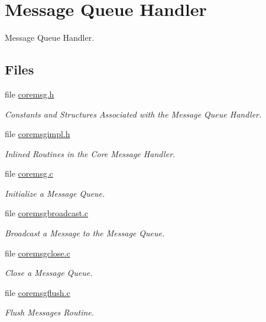 \hypertarget{group__RTEMSScoreMessageQueue}{}\section{Message Queue Handler}
\label{group__RTEMSScoreMessageQueue}


Message Queue Handler.  


\subsection*{Files}
\begin{DoxyCompactItemize}
\item 
file \mbox{\hyperlink{coremsg_8h}{coremsg.\+h}}
\begin{DoxyCompactList}\small\item\em Constants and Structures Associated with the Message Queue Handler. \end{DoxyCompactList}\item 
file \mbox{\hyperlink{coremsgimpl_8h}{coremsgimpl.\+h}}
\begin{DoxyCompactList}\small\item\em Inlined Routines in the Core Message Handler. \end{DoxyCompactList}\item 
file \mbox{\hyperlink{coremsg_8c}{coremsg.\+c}}
\begin{DoxyCompactList}\small\item\em Initialize a Message Queue. \end{DoxyCompactList}\item 
file \mbox{\hyperlink{coremsgbroadcast_8c}{coremsgbroadcast.\+c}}
\begin{DoxyCompactList}\small\item\em Broadcast a Message to the Message Queue. \end{DoxyCompactList}\item 
file \mbox{\hyperlink{coremsgclose_8c}{coremsgclose.\+c}}
\begin{DoxyCompactList}\small\item\em Close a Message Queue. \end{DoxyCompactList}\item 
file \mbox{\hyperlink{coremsgflush_8c}{coremsgflush.\+c}}
\begin{DoxyCompactList}\small\item\em Flush Messages Routine. \end{DoxyCompactList}\item 

\end{DoxyCompactItemize}
